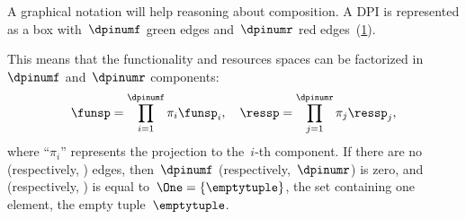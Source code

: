 

A graphical notation will help reasoning about composition. A DPI is represented as a box with~$\dpinumf$ green edges and~$\dpinumr$ red edges~(\cref{fig:dp_graphical}).

\begin{figure}[h]
  \centering
  \caption{\label{fig:dp_graphical}}
\end{figure}


This means that the functionality and resources spaces can be factorized in~$\dpinumf$ and~$\dpinumr$ components:
\begin{equation*}
  \funsp=\prod_{i=1}^{\dpinumf}\pi_{i}\funsp_{i},\quad \ressp=\prod_{j=1}^{\dpinumr}\pi_{j}\ressp_{j},
\end{equation*}
where ``$\pi_{i}$'' represents the projection to the~$i$-th component.
If there are no  (respectively, ) edges, then~$\dpinumf$ (respectively,~$\dpinumr$) is zero, and \funsp (respectively, \ressp) is equal to~$\One=\{\emptytuple \}$, the set containing one element, the empty tuple~$\emptytuple$.

